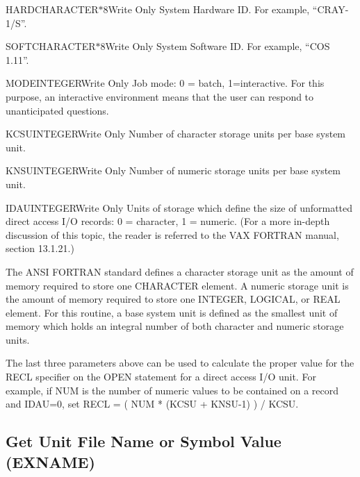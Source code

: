 
\begin{argy}{HARD}{CHARACTER$*$8}{Write Only}
System Hardware ID.  For example, ``CRAY-1/S''.
\end{argy}

\begin{argy}{SOFT}{CHARACTER$*$8}{Write Only}
System Software ID.  For example, ``COS 1.11''.
\end{argy}

\begin{argy}{MODE}{INTEGER}{Write Only}
Job mode: 0 = batch, 1=interactive.  For this purpose, an interactive
environment means that the user can respond to unanticipated questions.
\end{argy}

\begin{argy}{KCSU}{INTEGER}{Write Only}
Number of character storage units per base system unit.
\end{argy}

\begin{argy}{KNSU}{INTEGER}{Write Only}
Number of numeric storage units per base system unit.
\end{argy}

\begin{argy}{IDAU}{INTEGER}{Write Only}
Units of storage which define the size of unformatted direct access I/O
records: 0 = character, 1 = numeric.
(For a more in-depth discussion of this topic, the reader is
referred to the VAX FORTRAN manual,
section 13.1.21.)
\end{argy}

The ANSI FORTRAN standard defines a character storage unit as the amount of
memory required to store one CHARACTER element.  A numeric storage unit is
the amount of memory required to store one INTEGER, LOGICAL, or REAL
element.  For this routine, a base system unit is defined as the smallest
unit of memory which holds an integral number of both character and numeric
storage units.

The last three parameters above can be used to calculate the proper value
for the RECL specifier on the OPEN statement for a direct access I/O unit.
For example, if NUM is the number of numeric values to be contained on a
record and IDAU=0, set RECL = ( NUM * (KCSU + KNSU-1) ) / KCSU.


\subsection{Get Unit File Name or Symbol Value (EXNAME)}

